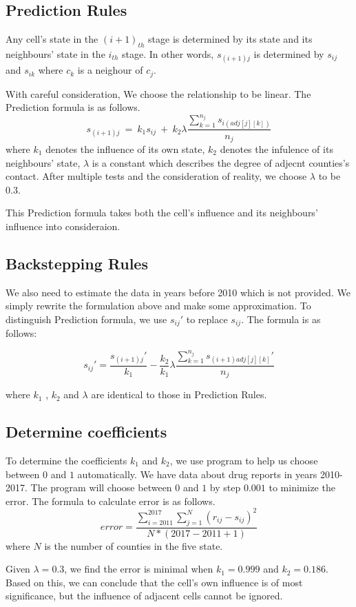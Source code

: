 \documentclass{mcmthesis}
\begin{document}
\newpage
\subsection{Prediction Rules }
Any cell's state in the $(i+1)_{th}$ stage is determined by its state and its neighbours' state in the $i_{th}$ stage. In other words, $s_{(i+1)j}$ is determined by $s_{ij}$ and $s_{ik}$ where $c_k$ is a neighour of $c_j$.\par
With careful consideration, We choose the relationship to be linear. The Prediction formula is as follows.
      $$ s_{(i+1)j} \ = \ k_1 s_{ij} \ + \ k_2 \lambda \frac{\sum\limits_{k=1} ^{n_j} s_{i (adj[j][k])} }{n_j} $$
    where $k_1$ denotes the influence of its own state, $k_2$ denotes the infulence of its neighbours' state, $\lambda$ is a constant which describes the degree of adjecnt counties's contact. After multiple tests and the consideration of reality, we choose $\lambda$ to be 0.3.\par

    This Prediction formula takes both the cell's influence and its neighbours' influence into consideraion.
\subsection{Backstepping Rules}
    We also need to estimate the data in years before 2010 which is not provided. We simply rewrite the formulation above and make some approximation. To distinguish Prediction formula, we use $s_{ij}'$ to replace $s_{ij}$. The formula is as follows:

       $$ s_{ij}' = \frac{s_{(i+1)j}'}{k_1} - \frac{k_2}{k_1} \lambda \frac{\sum\limits_{k=1} ^{n_j} s_{(i+1) adj[j][k]}' }{n_j} $$
      
      where $k_1$ , $k_2$ and $\lambda$ are identical to those in Prediction Rules. 

\subsection{Determine coefficients} \label{Section:Determine coefficients}
    To determine the coefficients $k_1$ and $k_2$, we use program to help us choose between $0$ and $1$ automatically. We have data about drug reports in years 2010-2017. The program will choose between $0$ and $1$ by step $0.001$  to minimize the error. The formula to calculate error is as follows.
    $$error = \frac{\sum\limits_{i=2011}^{2017} \sum_{j=1}^{N} (r_{ij} - s_{ij})^2  }{N * (2017-2011+1)}$$ 
    where $N$ is the number of counties in the five state. \par
    Given $\lambda=0.3$, we find the error is minimal when $k_1=0.999$ and $k_2=0.186$. Based on this, we can conclude that the cell's own influence is of most significance, but the influence of adjacent cells cannot be ignored.
\end{document}
